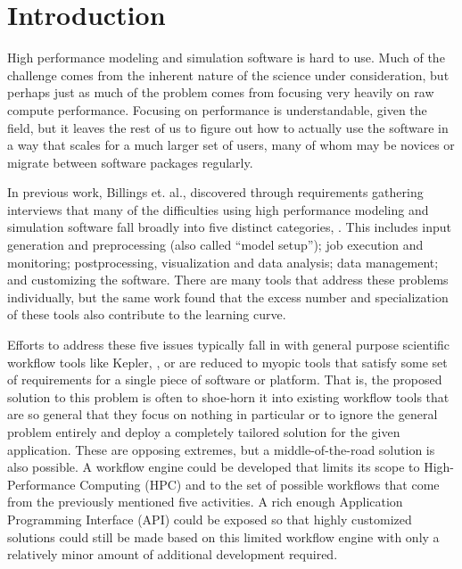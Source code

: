\section{Introduction}

High performance modeling and simulation software is hard to use. Much of the
challenge comes from the inherent nature of the science
under consideration, but perhaps just as much of the problem comes from
focusing very heavily on raw compute performance. Focusing on performance is
understandable, given the field, but it leaves the rest of us to figure out how
to actually use the software in a way that scales for a much larger set of
users, many of whom may be novices or migrate between software packages regularly.

In previous work, Billings et. al., discovered through requirements gathering
interviews that many of the difficulties using high performance modeling and
simulation software fall broadly into five distinct categories,
\cite{billings_cbhpc}. This includes input generation and preprocessing (also
called ``model setup''); job execution and monitoring; postprocessing,
visualization and data analysis; data management; and customizing the software.
There are many tools that address these problems individually, but the same
work found that the excess number and specialization of these tools also
contribute to the learning curve.

Efforts to address these five issues typically fall in with general purpose
scientific workflow tools like Kepler, \cite{kepler}, or are reduced to myopic
tools that satisfy some set of requirements for a single piece of software or
platform. That is, the proposed solution to this problem is often to shoe-horn
it into existing workflow tools that are so general that they focus on nothing
in particular or to ignore the general problem entirely and deploy a completely
tailored solution for the given application. These are opposing extremes, but a
middle-of-the-road solution is also possible. A workflow engine could be
developed that limits its scope to High-Performance Computing (HPC) and to the
set of possible workflows that come from the previously mentioned five
activities. A rich enough Application Programming Interface (API) could be
exposed so that highly customized solutions could still be made based on this
limited workflow engine with only a relatively minor amount of additional
development required.


